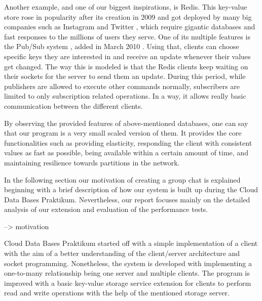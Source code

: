 Another example, and one of our biggest inspirations, is Redis. This key-value store rose in popularity after its creation in 2009 and got deployed by many big companies such as Instagram \cite{krieger2011instagram} and Twitter \cite{yu2014twitter}, which require gigantic databases and fast responses to the millions of users they serve. One of its multiple features is the Pub/Sub system \cite{redis2020pubsub}, added in March 2010 \cite{sanfilippo2010pubsub}. Using that, clients can choose specific keys they are interested in and receive an update whenever their values get changed. The way this is modeled is that the Redis clients keep waiting on their sockets for the server to send them an update. During this period, while publishers are allowed to execute other commands normally, subscribers are limited to only subscription related operations. In a way, it allows really basic communication between the different clients.


By observing the provided features of above-mentioned databases, one can say that our program is a very small scaled version of them. It provides the core functionalities such as providing elasticity, responding the client with consistent values as fast as possible, being available within a certain amount of time, and maintaining resilience towards partitions in the network.
 
In the following section our motivation of creating a group chat is explained beginning with a brief description of how our system is built up during the Cloud Data Bases Praktikum. Nevertheless, our report focuses mainly on the detailed analysis of our extension and evaluation of the performance tests.

--> motivation 

Cloud Data Bases Praktikum started off with a simple implementation of a client with the aim of a better understanding of the client/server architecture and socket programming. Nonetheless, the system is developed with implementing a one-to-many relationship being one server and multiple clients. The program is improved with a basic key-value storage service extension for clients to perform read and write operations with the help of the mentioned storage server. 

